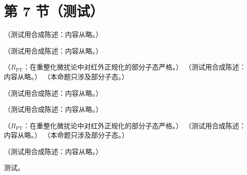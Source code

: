 \section{第 7 节（测试）}\label{sec:appM-forward}

\begin{lemma}\label{lem:appM-newton}
（测试用合成陈述：内容从略。）
\end{lemma}

\begin{lemma}[拟阵形式与维数正规化的可容许性]\label{lem:appM-matroid}
（测试用合成陈述：内容从略。）
\end{lemma}

\begin{theorem}\label{thm:appM-forward-expansion}
（$R_{\mathrm{PT}}$：在重整化微扰论中对红外正规化的部分子态严格。）
（测试用合成陈述：内容从略。）
（本命题只涉及部分子态。）
\end{theorem}

\begin{example}\label{ex:appM-forward-triangle}
（测试用合成陈述：内容从略。）
\end{example}

\begin{example}\label{ex:appM-forward-nonuniform}
（测试用合成陈述：内容从略。）
\end{example}

\begin{lemma}\label{lem:appM-t2-projector}
（$R_{\mathrm{PT}}$：在重整化微扰论中对红外正规化的部分子态严格。）
（测试用合成陈述：内容从略。）
（本命题只涉及部分子态。）
\end{lemma}

\begin{corollary}\label{cor:appM-forward-ope}
（测试用合成陈述：内容从略。）
\end{corollary}
\begin{proofsketch}测试。\end{proofsketch}
